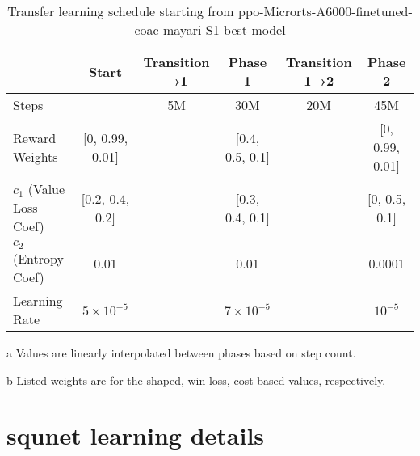 \documentclass[conference]{IEEEtran}
\newcounter{supptable}
\newenvironment{supptable}
  {\renewcommand{\tablename}{Supplemental Table}\setcounter{table}{\value{supptable}}\addtocounter{supptable}{1}\begin{table}}
  {\end{table}\setcounter{supptable}{\value{table}}}
\begin{document}
\begin{supptable}[H]
    \centering
    \begin{threeparttable}
    \caption{Transfer learning schedule starting from ppo-Microrts-A6000-finetuned-coac-mayari-S1-best model}
    \label{tab:transfer-learning-schedule}
    \begin{tabular}{lccccc}
    \toprule
     & Start & Transition →1\tnote{a} & Phase 1 & Transition 1→2\tnote{a} & Phase 2 \\
     \midrule
    Steps & & 5M & 30M & 20M & 45M \\
    Reward Weights\tnote{b} & [0, 0.99, 0.01] & & [0.4, 0.5, 0.1] & & [0, 0.99, 0.01] \\
    $c_1$ (Value Loss Coef)\tnote{b} & [0.2, 0.4, 0.2] & & [0.3, 0.4, 0.1] & & [0, 0.5, 0.1]\\
    $c_2$ (Entropy Coef) & 0.01 & & 0.01 & & 0.0001 \\
    Learning Rate & $5 \times 10^{-5}$ & & $7 \times 10^{-5}$ & & $10^{-5}$ \\
    \bottomrule
    \end{tabular}
    \begin{tablenotes}
       \item[a] Values are linearly interpolated between phases based on step count.
       \item[b] Listed weights are for the shaped, win-loss, cost-based values, respectively.
    \end{tablenotes}
    \end{threeparttable}
\end{supptable}

\section{squnet learning details}
\label{appendix:squnet-learning-details}
\end{document}

